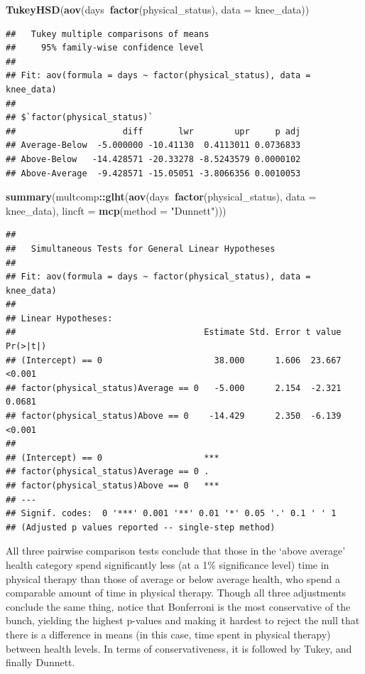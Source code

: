 \documentclass[]{article}
\newenvironment{Shaded}{\begin{snugshade}}{\end{snugshade}}
\newcommand{\KeywordTok}[1]{\textcolor[rgb]{0.13,0.29,0.53}{\textbf{#1}}}
\newcommand{\DataTypeTok}[1]{\textcolor[rgb]{0.13,0.29,0.53}{#1}}
\newcommand{\StringTok}[1]{\textcolor[rgb]{0.31,0.60,0.02}{#1}}
\newcommand{\OperatorTok}[1]{\textcolor[rgb]{0.81,0.36,0.00}{\textbf{#1}}}
\newcommand{\NormalTok}[1]{#1}
\begin{document}
\begin{Shaded}
\begin{Highlighting}[]
\KeywordTok{TukeyHSD}\NormalTok{(}\KeywordTok{aov}\NormalTok{(days}\OperatorTok{~}\KeywordTok{factor}\NormalTok{(physical_status), }\DataTypeTok{data =}\NormalTok{ knee_data))}
\end{Highlighting}
\end{Shaded}

\begin{verbatim}
##   Tukey multiple comparisons of means
##     95% family-wise confidence level
## 
## Fit: aov(formula = days ~ factor(physical_status), data = knee_data)
## 
## $`factor(physical_status)`
##                     diff       lwr        upr     p adj
## Average-Below  -5.000000 -10.41130  0.4113011 0.0736833
## Above-Below   -14.428571 -20.33278 -8.5243579 0.0000102
## Above-Average  -9.428571 -15.05051 -3.8066356 0.0010053
\end{verbatim}

\begin{Shaded}
\begin{Highlighting}[]
\KeywordTok{summary}\NormalTok{(multcomp}\OperatorTok{::}\KeywordTok{glht}\NormalTok{(}\KeywordTok{aov}\NormalTok{(days}\OperatorTok{~}\KeywordTok{factor}\NormalTok{(physical_status), }\DataTypeTok{data =}\NormalTok{ knee_data),}
               \DataTypeTok{lincft =} \KeywordTok{mcp}\NormalTok{(}\DataTypeTok{method =} \StringTok{"Dunnett"}\NormalTok{)))}
\end{Highlighting}
\end{Shaded}

\begin{verbatim}
## 
##   Simultaneous Tests for General Linear Hypotheses
## 
## Fit: aov(formula = days ~ factor(physical_status), data = knee_data)
## 
## Linear Hypotheses:
##                                     Estimate Std. Error t value Pr(>|t|)
## (Intercept) == 0                      38.000      1.606  23.667   <0.001
## factor(physical_status)Average == 0   -5.000      2.154  -2.321   0.0681
## factor(physical_status)Above == 0    -14.429      2.350  -6.139   <0.001
##                                        
## (Intercept) == 0                    ***
## factor(physical_status)Average == 0 .  
## factor(physical_status)Above == 0   ***
## ---
## Signif. codes:  0 '***' 0.001 '**' 0.01 '*' 0.05 '.' 0.1 ' ' 1
## (Adjusted p values reported -- single-step method)
\end{verbatim}

All three pairwise comparison tests conclude that those in the `above
average' health category spend significantly less (at a 1\% significance
level) time in physical therapy than those of average or below average
health, who spend a comparable amount of time in physical therapy.
Though all three adjustments conclude the same thing, notice that
Bonferroni is the most conservative of the bunch, yielding the highest
p-values and making it hardest to reject the null that there is a
difference in means (in this case, time spent in physical therapy)
between health levels. In terms of conservativeness, it is followed by
Tukey, and finally Dunnett.
\end{document}
